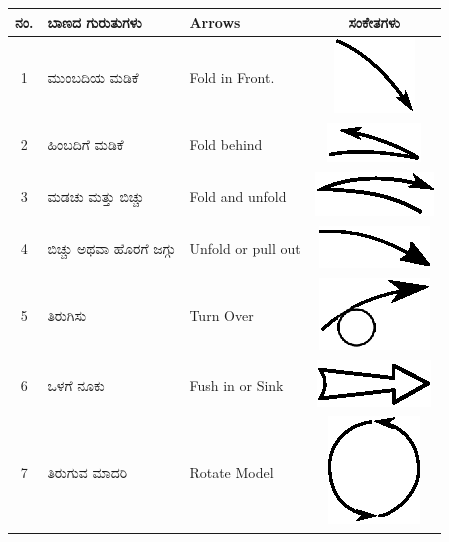 \begin{longtable}[l]{|c|l|l|c|}
\hline
ನಂ.  & ಬಾಣದ ಗುರುತುಗಳು & Arrows & ಸಂಕೇತಗಳು \\
\hline
1  & ಮುಂಬದಿಯ ಮಡಿಕೆ & Fold in Front. & {\includegraphics[scale=.98]{src/figure/chap1/fig1a_1.eps}}\\
\hline
2 &ಹಿಂಬದಿಗೆ ಮಡಿಕೆ &  Fold behind & {\includegraphics[scale=.98]{src/figure/chap1/fig1a_2.eps}}\\
\hline
3 & ಮಡಚು ಮತ್ತು ಬಿಚ್ಚು & Fold and unfold & {\includegraphics[scale=.98]{src/figure/chap1/fig1a_3.eps}}\\
\hline
4 & ಬಿಚ್ಚು  ಅಥವಾ ಹೊರಗೆ ಜಗ್ಗು & Unfold or pull out & {\includegraphics[scale=.98]{src/figure/chap1/fig1a_4.eps}}\\
\hline
5 & ತಿರುಗಿಸು & Turn Over & {\includegraphics[scale=.98]{src/figure/chap1/fig1a_5.eps}}\\
\hline
6 & ಒಳಗೆ ನೂಕು & Fush in or Sink & {\includegraphics[scale=.98]{src/figure/chap1/fig1a_6.eps}}\\
\hline
7 & ತಿರುಗುವ ಮಾದರಿ &  Rotate Model & {\includegraphics[scale=.98]{src/figure/chap1/fig1a_7.eps}}\\

\end{longtable}
